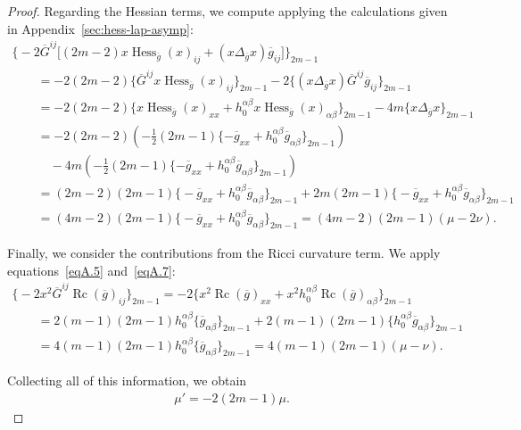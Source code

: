 \documentclass[11pt]{article}
\numberwithin{equation}{section}
\newcommand{\olg}{\overline{g}}
\newcommand{\olG}{\overline{G}}
\newcommand{\gbar}{\overline{g}}
\DeclareMathOperator{\Rc}{Rc}
\DeclareMathOperator{\hess}{Hess}
\begin{document}
\begin{proof}
Regarding the Hessian terms, we compute applying the calculations given in Appendix~\ref{sec:hess-lap-asymp}:
\begin{gather*}%
\big\{{-}2 \olG^{ij}\big[ (2m-2) x\hess_{\olg} (x)_{ij} +(x\Delta_{\olg} x) \olg_{ij} \big]\big\}_{2m-1} \\
\qquad{} = -2 (2m-2) \big\{ \olG^{ij} x\hess_{\olg} (x)_{ij}\big\}_{2m-1} -2 \big\{ (x\Delta_{\olg} x) \olG^{ij} \gbar_{ij}\big\}_{2m-1}\\
\qquad{} = -2 (2m-2) \big\{ x\hess_{\olg} (x)_{xx} + h_0^{\alpha \beta} x\hess_{\olg} (x)_{\alpha \beta}\big\}_{2m-1} -4m \{ x\Delta_{\olg} x\}_{2m-1} \\
\qquad{} = -2( 2m-2) \left( -\frac{1}{2} (2m-1) \{ -\gbar_{xx}+h^{\alpha \beta}_0 \gbar_{\alpha \beta} \}_{2m-1}\right) \\
\qquad \quad{}- 4m \left(-\frac{1}{2} (2m-1) \{ -\gbar_{xx} + h^{\alpha \beta}_0 \gbar_{\alpha \beta} \}_{2m-1}\right) \\
\qquad{}= ( 2m-2) (2m-1) \big\{ {-}\gbar_{xx}+h^{\alpha \beta}_0 \gbar_{\alpha \beta} \big\}_{2m-1}+ 2m (2m-1) \big\{ {-}\gbar_{xx} + h^{\alpha \beta}_0 \gbar_{\alpha \beta} \big\}_{2m-1} \\
\qquad{}= ( 4m-2) (2m-1) \big\{ {-}\gbar_{xx}+h^{\alpha \beta}_0 \gbar_{\alpha \beta} \big\}_{2m-1} = (4m-2)(2m-1) (\mu - 2\nu).
\end{gather*}

Finally, we consider the contributions from the Ricci curvature term. We apply equations~\eqref{eqA.5} and~\eqref{eqA.7}:
\begin{gather*}%
\big\{{-}2 x^2\olG^{ij}\Rc(\gbar)_{ij}\big\}_{2m-1} = -2 \big\{ x^2 \Rc(\gbar)_{xx} + x^2 h^{\alpha \beta}_0 \Rc(\gbar)_{\alpha \beta} \big\}_{2m-1} \\
\qquad {} = 2(m-1)(2m-1) h^{\alpha \beta}_0 \{\gbar_{\alpha \beta}\}_{2m-1} + 2(m-1)(2m-1) \big\{ h^{\alpha \beta}_0\gbar_{\alpha \beta}\big\}_{2m-1}\\
\qquad{} = 4(m-1)(2m-1) h^{\alpha \beta}_0 \{\gbar_{\alpha \beta}\}_{2m-1} = 4(m-1)(2m-1) (\mu - \nu).
\end{gather*}

Collecting all of this information, we obtain
\begin{gather*}%
\mu' = -2 (2m-1) \mu.
\end{gather*}


\end{proof}
\end{document}
